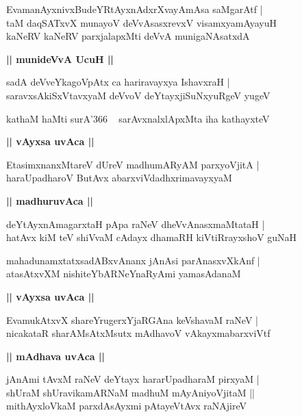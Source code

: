 \documentclass[twoside,12pt,openright]{book}
\newcounter{shloka}[chapter]
\def\uvaca#1{\centerline{{\large\textbf{#1}}}}
\begin{document}
\begin{shloka}%
EvamanAyxnivxBudeYRtAyxnAdxrXvayAmAsa saMgarAtf |\\
taM daqSATxvX munayoV deVvAsasxrevxV visamxyamAyayuH \\
kaNeRV kaNeRV parxjalapxMti deVvA munigaNAsatxdA 
\end{shloka}

\uvaca{|| munideVvA UcuH ||}

\begin{shloka}%
sadA deVveYkagoVpAtx ca hariravayxya IshavxraH |\\
saravxsAkiSxVtavxyaM deVvoV deYtayxjiSuNxyuRgeV yugeV 
\end{shloka}

\begin{shloka}%
kathaM haMti surA\char'366 ~ sarAvxnalxlApxMta iha kathayxteV 
\end{shloka}

\uvaca{|| vAyxsa uvAca ||}

\begin{shloka}%
EtasimxnanxMtareV dUreV madhumARyAM parxyoVjitA |\\
haraUpadharoV ButAvx abarxviVdadhxrimavayxyaM 
\end{shloka}

\uvaca{|| madhuruvAca ||}

\begin{shloka}%
deYtAyxnAmagarxtaH pApa raNeV dheVvAnasxmaMtataH |\\
hatAvx kiM teV shiVvaM cAdayx dhamaRH kiVtiRrayxshoV guNaH 
\end{shloka}

\begin{shloka}%
mahadunamxtatxsadABxvAnanx jAnAsi parAnasxvXkAnf |\\
atasAtxvXM nishiteYbARNeYnaRyAmi yamasAdanaM 
\end{shloka}

\uvaca{|| vAyxsa uvAca ||}

\begin{shloka}%
EvamukAtxvX shareYrugerxYjaRGAna keVshavaM raNeV |\\
nicakataR sharAMsAtxMsutx mAdhavoV vAkayxmabarxviVtf
\end{shloka}

\uvaca{|| mAdhava uvAca ||}

\begin{shloka}%
jAnAmi tAvxM raNeV deYtayx hararUpadharaM pirxyaM |\\
shUraM shUravikamARNaM madhuM mAyAniyoVjitaM ||\\
mithAyxloVkaM parxdAsAyxmi pAtayeVtAvx raNAjireV 
\end{shloka}
\end{document}
